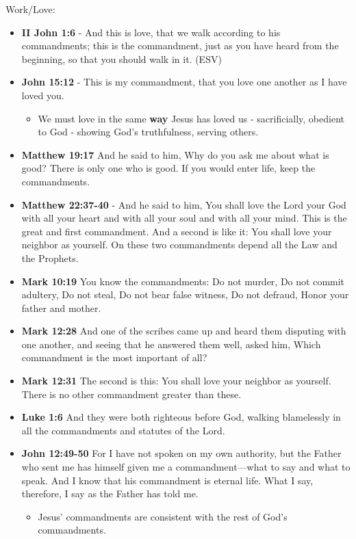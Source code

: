 \documentclass[11pt]{article}
\begin{document}
Work/Love:
\begin{itemize}
\item \textbf{II John 1:6} - And this is love, that we walk according to his commandments; this is the commandment, just as you have heard from the beginning, so that you should walk in it. (ESV)
\item \textbf{John 15:12} - This is my commandment, that you love one another as I have loved you.
\begin{itemize}
\item We must love in the same \textbf{way} Jesus has loved us - sacrificially, obedient to God - showing God's truthfulness, serving others.
\end{itemize}
\item \textbf{Matthew 19:17} And he said to him, Why do you ask me about what is good? There is only one who is good. If you would enter life, keep the commandments.
\item \textbf{Matthew 22:37-40} - And he said to him, You shall love the Lord your God with all your heart and with all your soul and with all your mind. This is the great and first commandment. And a second is like it: You shall love your neighbor as yourself. On these two commandments depend all the Law and the Prophets.
\item \textbf{Mark 10:19} You know the commandments: Do not murder, Do not commit adultery, Do not steal, Do not bear false witness, Do not defraud, Honor your father and mother.
\item \textbf{Mark 12:28} And one of the scribes came up and heard them disputing with one another, and seeing that he answered them well, asked him, Which commandment is the most important of all?
\item \textbf{Mark 12:31} The second is this: You shall love your neighbor as yourself. There is no other commandment greater than these.
\item \textbf{Luke 1:6} And they were both righteous before God, walking blamelessly in all the commandments and statutes of the Lord.
\item \textbf{John 12:49-50} For I have not spoken on my own authority, but the Father who sent me has himself given me a commandment—what to say and what to speak. And I know that his commandment is eternal life. What I say, therefore, I say as the Father has told me.
\begin{itemize}
\item Jesus' commandments are consistent with the rest of God's commandments.
\end{itemize}

\end{itemize}
\end{document}
